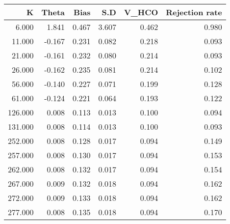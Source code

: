 \begin{tabular}{rrrrrr}
  \hline
K & Theta & Bias & S.D & V\_HCO & Rejection rate \\ 
  \hline
6.000 & 1.841 & 0.467 & 3.607 & 0.462 & 0.980 \\ 
  11.000 & -0.167 & 0.231 & 0.082 & 0.218 & 0.093 \\ 
  21.000 & -0.161 & 0.232 & 0.080 & 0.214 & 0.093 \\ 
  26.000 & -0.162 & 0.235 & 0.081 & 0.214 & 0.102 \\ 
  56.000 & -0.140 & 0.227 & 0.071 & 0.199 & 0.128 \\ 
  61.000 & -0.124 & 0.221 & 0.064 & 0.193 & 0.122 \\ 
  126.000 & 0.008 & 0.113 & 0.013 & 0.100 & 0.094 \\ 
  131.000 & 0.008 & 0.114 & 0.013 & 0.100 & 0.093 \\ 
  252.000 & 0.008 & 0.128 & 0.017 & 0.094 & 0.149 \\ 
  257.000 & 0.008 & 0.130 & 0.017 & 0.094 & 0.153 \\ 
  262.000 & 0.008 & 0.132 & 0.017 & 0.094 & 0.154 \\ 
  267.000 & 0.009 & 0.132 & 0.018 & 0.094 & 0.162 \\ 
  272.000 & 0.009 & 0.133 & 0.018 & 0.094 & 0.162 \\ 
  277.000 & 0.008 & 0.135 & 0.018 & 0.094 & 0.170 \\ 
   \hline
\end{tabular}
